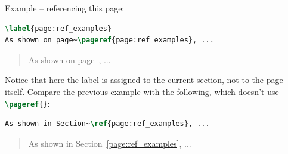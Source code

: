 Example -- referencing this page:
\begin{lstlisting}[language=TeX]
\label{page:ref_examples}
As shown on page~\pageref{page:ref_examples}, ...
\end{lstlisting}
\begin{quote}
    \label{page:ref_examples}
    As shown on page~\pageref{page:ref_examples}, ...
\end{quote}

Notice that here the label is assigned to the current section, not to the page itself.
Compare the previous example with the following, which doesn't use \lstinline[language=TeX]|\pageref{}|:
\begin{lstlisting}[language=TeX]
As shown in Section~\ref{page:ref_examples}, ...
\end{lstlisting}
\begin{quote}
    As shown in Section~\ref{page:ref_examples}, ...
\end{quote}
